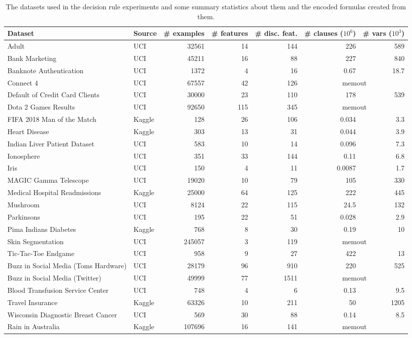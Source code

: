 \begin{sidewaystable}
    \centering
    \caption{The datasets used in the decision rule experiments and some summary statistics about them and the encoded formulas created from them.}\label{tab:datasets}
    {\small
    \begin{tabular}{@{}llrrrrr@{}}
        \toprule
        Dataset & Source & \# examples & \# features & \# disc. feat. & \# clauses ($10^6$) & \# vars ($10^3$) \\
        \midrule
        Adult & UCI & 32561 & 14 & 144 & 226 & 589 \\
        Bank Marketing & UCI & 45211 & 16 & 88 & 227 & 840 \\
        Banknote Authentication & UCI & 1372 & 4 & 16 & 0.67 & 18.7\\
        Connect 4 & UCI & 67557 & 42 & 126 & \multicolumn{2}{c}{memout} \\
        Default of Credit Card Clients & UCI & 30000 & 23 & 110 & 178 & 539 \\
        Dota 2 Games Results & UCI & 92650 & 115 & 345 & \multicolumn{2}{c}{memout}\\
        FIFA 2018 Man of the Match & Kaggle & 128 & 26 & 106 & 0.034 & 3.3 \\
        Heart Disease & Kaggle & 303 & 13 & 31 & 0.044 & 3.9 \\
        Indian Liver Patient Dataset & UCI & 583 & 10 & 14 & 0.096 & 7.3 \\
        Ionosphere & UCI & 351 & 33 & 144 & 0.11 & 6.8 \\
        Iris & UCI & 150 & 4 & 11 & 0.0087 & 1.7 \\
        MAGIC Gamma Telescope & UCI & 19020 & 10 & 79 & 105 & 330 \\
        Medical Hospital Readmissions & Kaggle & 25000 & 64 & 125 & 222 & 445 \\
        Mushroom & UCI & 8124 & 22 & 115 & 24.5 & 132 \\
        Parkinsons & UCI & 195 & 22 & 51 & 0.028 & 2.9 \\
        Pima Indians Diabetes & Kaggle & 768 & 8 & 30 & 0.19 & 10 \\
        Skin Segmentation & UCI & 245057 & 3 & 119 & \multicolumn{2}{c}{memout} \\
        Tic-Tac-Toe Endgame & UCI & 958 & 9 & 27 & 422 & 13 \\
        Buzz in Social Media (Toms Hardware) & UCI & 28179 & 96 & 910 & 220 & 525 \\
        Buzz in Social Media (Twitter) & UCI & 49999 & 77 & 1511 & \multicolumn{2}{c}{memout} \\
        Blood Transfusion Service Center & UCI & 748 & 4 & 6 & 0.13 & 9.5 \\
        Travel Insurance & Kaggle & 63326 & 10 & 211 & 50 & 1205 \\
        Wisconsin Diagnostic Breast Cancer & UCI & 569 & 30 & 88 & 0.14 & 8.5 \\
        Rain in Australia & Kaggle & 107696 & 16 & 141 & \multicolumn{2}{c}{memout} \\
        \bottomrule
    \end{tabular}
    }
\end{sidewaystable}